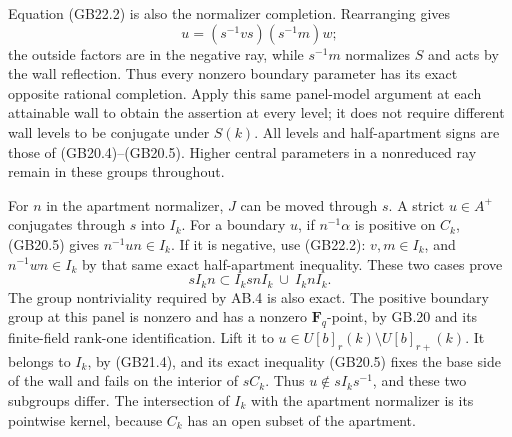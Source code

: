\documentclass[
  11pt,
]{article}
\begin{document}
Equation (GB22.2) is also the normalizer completion. Rearranging gives
\[
 u=(s^{-1}vs)(s^{-1}m)w ;
\] the outside factors are in the negative ray, while \(s^{-1}m\)
normalizes \(S\) and acts by the wall reflection. Thus every nonzero
boundary parameter has its exact opposite rational completion. Apply
this same panel-model argument at each attainable wall to obtain the
assertion at every level; it does not require different wall levels to
be conjugate under \(S(k)\). All levels and half-apartment signs are
those of (GB20.4)--(GB20.5). Higher central parameters in a nonreduced
ray remain in these groups throughout.

For \(n\) in the apartment normalizer, \(J\) can be moved through \(s\).
A strict \(u\in A^+\) conjugates through \(s\) into \(I_k\). For a
boundary \(u\), if \(n^{-1}\alpha\) is positive on \(C_k\), (GB20.5)
gives \(n^{-1}un\in I_k\). If it is negative, use (GB22.2):
\(v,m\in I_k\), and \(n^{-1}wn\in I_k\) by that same exact
half-apartment inequality. These two cases prove \[
                sI_kn\subset I_ksnI_k\ \cup\ I_knI_k .      \tag{GB22.3}
\] The group nontriviality required by AB.4 is also exact. The positive
boundary group at this panel is nonzero and has a nonzero
\(\mathbf F_q\)-point, by GB.20 and its finite-field rank-one
identification. Lift it to \(u\in U[b]_r(k)\setminus U[b]_{r+}(k)\). It
belongs to \(I_k\), by (GB21.4), and its exact inequality (GB20.5) fixes
the base side of the wall and fails on the interior of \(sC_k\). Thus
\(u\notin sI_ks^{-1}\), and these two subgroups differ. The intersection
of \(I_k\) with the apartment normalizer is its pointwise kernel,
because \(C_k\) has an open subset of the apartment.
\end{document}
